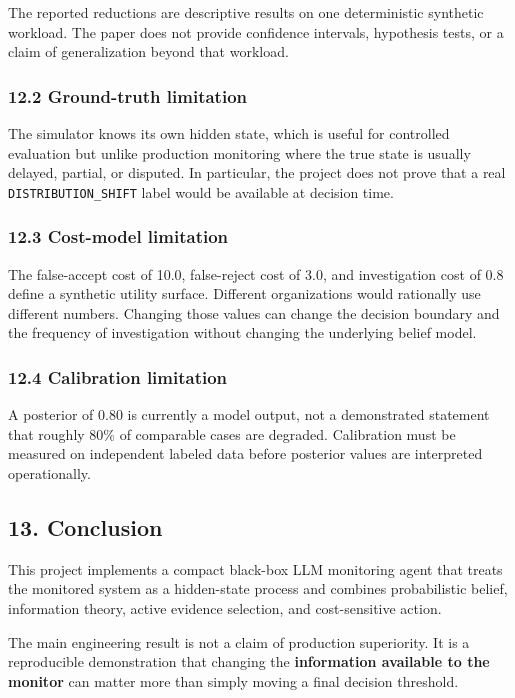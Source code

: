 \documentclass[
]{article}
\begin{document}
The reported reductions are descriptive results on one deterministic
synthetic workload. The paper does not provide confidence intervals,
hypothesis tests, or a claim of generalization beyond that workload.

\subsubsection{12.2 Ground-truth
limitation}\label{ground-truth-limitation}

The simulator knows its own hidden state, which is useful for controlled
evaluation but unlike production monitoring where the true state is
usually delayed, partial, or disputed. In particular, the project does
not prove that a real \texttt{DISTRIBUTION\_SHIFT} label would be
available at decision time.

\subsubsection{12.3 Cost-model limitation}\label{cost-model-limitation}

The false-accept cost of 10.0, false-reject cost of 3.0, and
investigation cost of 0.8 define a synthetic utility surface. Different
organizations would rationally use different numbers. Changing those
values can change the decision boundary and the frequency of
investigation without changing the underlying belief model.

\subsubsection{12.4 Calibration
limitation}\label{calibration-limitation}

A posterior of 0.80 is currently a model output, not a demonstrated
statement that roughly 80\% of comparable cases are degraded.
Calibration must be measured on independent labeled data before
posterior values are interpreted operationally.

\subsection{13. Conclusion}\label{conclusion}

This project implements a compact black-box LLM monitoring agent that
treats the monitored system as a hidden-state process and combines
probabilistic belief, information theory, active evidence selection, and
cost-sensitive action.

The main engineering result is not a claim of production superiority. It
is a reproducible demonstration that changing the \textbf{information
available to the monitor} can matter more than simply moving a final
decision threshold.
\end{document}
